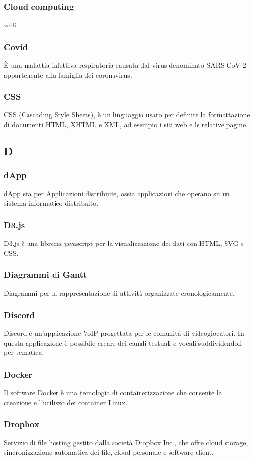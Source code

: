 \subsubsection*{Cloud computing} vedi .
\subsubsection*{Covid} È una malattia infettiva respiratoria causata dal virus denominato SARS-CoV-2 appartenente alla famiglia dei coronavirus.
\subsubsection*{CSS} CSS (Cascading Style Sheets), è un linguaggio usato per definire la formattazione di documenti HTML, XHTML e XML, ad esempio i siti web e le relative pagine.
\subsection*{D}
\subsubsection*{dApp} dApp sta per Applicazioni distribuite, ossia applicazioni che operano su un sistema informatico distribuito.
\subsubsection*{D3.js} D3.js è una libreria javascript per la visualizzazione dei dati con HTML, SVG e CSS.
\subsubsection*{Diagrammi di Gantt} Diagrammi per la rappresentazione di attività organizzate cronologicamente.
\subsubsection*{Discord} Discord è un’applicazione VoIP progettata per le comunità di videogiocatori. In questa applicazione è possibile creare dei canali testuali e vocali suddividendoli per tematica.
\subsubsection*{Docker} Il software Docker è una tecnologia di containerizzazione che consente la creazione e l’utilizzo dei container Linux.
\subsubsection*{Dropbox} Servizio di file hosting gestito dalla società Dropbox Inc., che offre cloud storage, sincronizzazione automatica dei file, cloud personale e software client.
